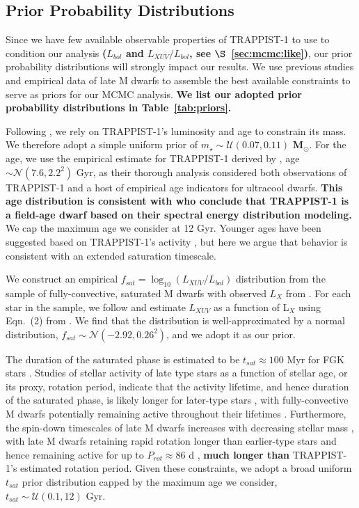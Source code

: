 \documentclass[twocolumn]{aastex62}
\def\gsim{~\rlap{$>$}{\lower 1.0ex\hbox{$\sim$}}}
\newcommand{\xxx}[1]{{\textbf{#1}}}
\begin{document}
\subsection{Prior Probability Distributions} \label{sec:mcmc:priors}

Since we have few available observable properties of TRAPPIST-1 to use to condition our analysis \xxx{($L_{bol}$ and $L_{XUV}/L_{bol}$, see $\S$~\ref{sec:mcmc:like})}, our prior probability distributions will strongly impact our results. We use previous studies and empirical data of late M dwarfs to assemble the best available constraints to serve as priors for our MCMC analysis. \xxx{We list our adopted prior probability distributions in Table~\ref{tab:priors}.}

Following \citet{vanGrootel2018}, we rely on TRAPPIST-1's luminosity and age to constrain its mass. We therefore adopt a simple uniform prior of $m_{\star} \sim \mathcal{U}(0.07, 0.11)$ \xxx{M$_{\odot}$}. For the age, we use the empirical estimate for TRAPPIST-1 derived by \citet{Burgasser2017}, age $\sim \mathcal{N}(7.6, 2.2^2)$ Gyr, as their thorough analysis considered both observations of TRAPPIST-1 and a host of empirical age indicators for ultracool dwarfs. \xxx{This age distribution is consistent with \citet{Gonzales2019} who conclude that TRAPPIST-1 is a field-age dwarf based on their spectral energy distribution modeling.} We cap the maximum age we consider at 12 Gyr. Younger ages have been suggested based on TRAPPIST-1's activity \citep[e.g.~$\gsim 500$ Myr,][]{Bourrier2017b}, but here we argue that behavior is consistent with an extended saturation timescale.

We construct an empirical $f_{sat} = \log_{10}(L_{XUV}/L_{bol})$ distribution from the sample of fully-convective, saturated M dwarfs with observed $L_{X}$ from \citet{Wright2011}. For each star in the \citet{Wright2011} sample, we follow \citet{Wheatley2017} and estimate $L_{XUV}$ as a function of L$_{X}$ using Eqn.~(2) from \citet{Chadney2015}. We find that the distribution is well-approximated by a normal distribution, $f_{sat} \sim \mathcal{N}(-2.92, 0.26^2)$, and we adopt it as our prior.  

The duration of the saturated phase is estimated to be $t_{sat} \approx 100$ Myr for FGK stars \citep{Jackson2012}. Studies of stellar activity of late type stars as a function of stellar age, or its proxy, rotation period, indicate that the activity lifetime, and hence duration of the saturated phase, is likely longer for later-type stars \citep{Shkolnik2014,Wright2011,West2015}, with fully-convective M dwarfs potentially remaining active throughout their lifetimes \citep[$t_{sat} \gsim 7$ Gyr,][]{West2008,Schneider2018}. Furthermore, the spin-down timescales of late M dwarfs increases with decreasing stellar mass \citep{Delfosse1998}, with late M dwarfs retaining rapid rotation longer than earlier-type stars and hence remaining active for up to $P_{rot} \approx 86$ d \citep{West2015}, \xxx{much longer than} TRAPPIST-1's estimated rotation period. Given these constraints, we adopt a broad uniform $t_{sat}$ prior distribution capped by the maximum age we consider, $t_{sat} \sim \mathcal{U}(0.1, 12)$ Gyr. 
\end{document}
